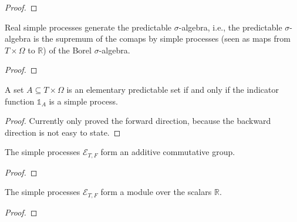 \begin{proof}
  \leanok
\end{proof}


\begin{lemma}\label{lem:iSup_comap_simpleProcess}
  \leanok
Real simple processes generate the predictable $\sigma$-algebra, i.e., the predictable $\sigma$-algebra is the supremum of the comaps by simple processes (seen as maps from $T \times \Omega$ to $\mathbb{R}$) of the Borel $\sigma$-algebra.
\end{lemma}

\begin{proof}
  \leanok
\end{proof}


\begin{lemma}\label{lem:elementaryPredictableSet_iff_indicator}
  \leanok
A set $A \subseteq T \times \Omega$ is an elementary predictable set if and only if the indicator function $\mathbb{1}_A$ is a simple process.
\end{lemma}

\begin{proof}
  \leanok
  Currently only proved the forward direction, because the backward direction is not easy to state.
\end{proof}


\begin{lemma}\label{lem:addCommGroup_simpleProcess}
  \leanok
The simple processes $\mathcal{E}_{T, F}$ form an additive commutative group.
\end{lemma}

\begin{proof}
  \leanok
\end{proof}


\begin{lemma}\label{lem:module_simpleProcess}
  \leanok
The simple processes $\mathcal{E}_{T, F}$ form a module over the scalars $\mathbb{R}$.
\end{lemma}

\begin{proof}
  \leanok
\end{proof}

